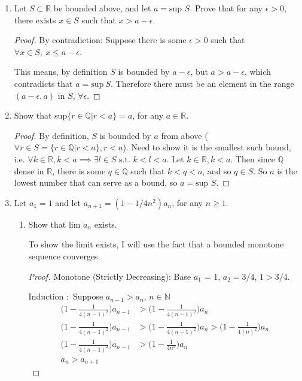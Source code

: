 \documentclass{article}
\begin{document}
\thispagestyle{fancy}
\begin{enumerate}
    \item Let $S \subset \mathbb{R}$ be bounded above, and let $a =\text{sup }S$. Prove that for any $\epsilon>0$, there exists $x \in S$ such that $x > a - \epsilon$.
    \begin{proof} By contradiction: Suppose there is some $\epsilon > 0$ such that $\forall x \in S,\: x \leq a - \epsilon$.

    This means, by definition $S$ is bounded by $a - \epsilon$, but $a > a - \epsilon$, which contradicts that $a = \text{sup}\ S$. Therefore there must be an element in the range $(a - \epsilon, a)$ in $S$, $\forall \epsilon$.
    \end{proof}

\item Show that sup$\{r \in \mathbb{Q}|r<a\} = a$, for any $a \in \mathbb{R}$.
\begin{proof}
By definition, $S$ is bounded by $a$ from above ($\forall r \in S = \{r \in \mathbb{Q}|r<a\}, r < a$). Need to show it is the smallest such bound, i.e. $\forall k \in \mathbb{R}, k < a \implies \exists l \in S \text{ s.t. } k < l < a$. Let $k \in \mathbb{R}, k < a$. Then since $\mathbb{Q}$ dense in $\mathbb{R}$, there is some $q \in \mathbb{Q}$ such that $k < q < a$, and so $q \in S$. So $a$ is the lowest number that can serve as a bound, so $a = \text{sup } S$.
\end{proof}

\item  Let $a_1 = 1$ and let $a_{n+1} = (1 - 1/4n^2)a_n$, for any $n \geq 1$.
    \begin{enumerate}
        \item Show that lim $a_n$ exists.
        
        To show the limit exists, I will use the fact that a bounded monotone sequence converges.
        \begin{proof}
        Monotone (Strictly Decreasing): Base $a_1$ = 1, $a_2 = 3/4$, $1 > 3/4$.

        Induction $:$ Suppose $a_{n-1} > a_n$, $ n \in \mathbb{N}$
        \begin{align*}
        \Big(1 - \frac{1}{4(n-1)^2} \Big) a_{n-1} &> \Big(1 - \frac{1}{4(n-1)^2}\Big)a_{n} \\
        \Big(1 - \frac{1}{4(n-1)^2} \Big) a_{n-1} &> \Big(1 - \frac{1}{4(n-1)^2}\Big)a_{n} > \Big(1 - \frac{1}{4(n)^2}\Big)a_{n} \\
        \Big(1 - \frac{1}{4(n-1)^2} \Big) a_{n-1} &> \Big(1 - \frac{1}{4n^2}\Big)a_{n} \\
        a_{n} > a_{n+1}
        \end{align*}


\end{proof}
\end{enumerate}
\end{enumerate}
\end{document}
